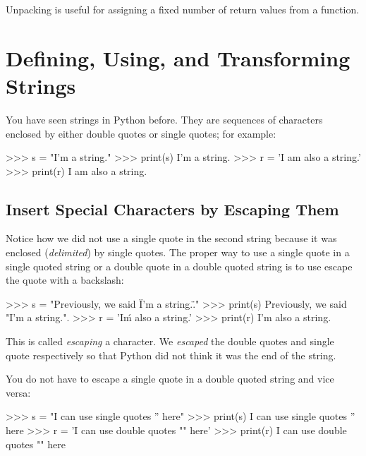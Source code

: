 \documentclass[11pt]{cselabheader}
\begin{document}
Unpacking is useful for assigning a fixed number of return values from a function.

\section{Defining, Using, and Transforming Strings}

You have seen strings in Python before. They are
sequences of characters enclosed by either double quotes or single
quotes; for example:

\begin{pyconcode}
>>> s = "I'm a string."
>>> print(s)
I'm a string.
>>> r = 'I am also a string.'
>>> print(r)
I am also a string.

\end{pyconcode}

\subsection{Insert Special Characters by Escaping Them }

Notice how we did not use a single quote in the second string because it was
enclosed (\emph{delimited}) by single quotes. The proper way to use a single
quote in a single quoted string or a double quote in a double quoted string
is to use escape the quote with a backslash:

\begin{pyconcode}
>>> s = "Previously, we said \"I'm a string.\"."
>>> print(s)
Previously, we said "I'm a string.".
>>> r = 'I\'m also a string.'
>>> print(r)
I'm also a string.

\end{pyconcode}

This is called \emph{escaping} a character. We \emph{escaped} the double quotes and single quote
respectively so that Python did not think it was the end of the
string.

You do not have to escape a single quote in a double quoted string and vice
versa:

\begin{pyconcode}
>>> s = "I can use single quotes '' here"
>>> print(s)
I can use single quotes '' here
>>> r = 'I can use double quotes "" here'
>>> print(r)
I can use double quotes "" here

\end{pyconcode}
\end{document}
